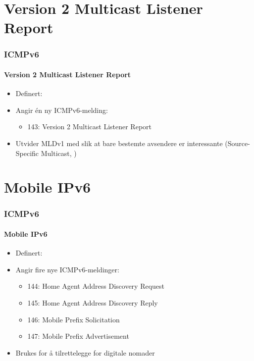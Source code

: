 \section{Version 2 Multicast Listener Report}
\begin{frame}%
  \frametitle{ICMPv6}
  \framesubtitle{Version 2 Multicast Listener Report}
  \begin{itemize}%
  \item Definert: 
  \item Angir én ny ICMPv6-melding:
    \begin{itemize}%
    \item 143: Version 2 Multicast Listener Report
    \end{itemize}
  \item Utvider MLDv1  med slik at bare bestemte avsendere
    er interessante (Source-Specific Multicast, )
  \end{itemize}
\end{frame}

\section{Mobile IPv6}
\begin{frame}%
  \frametitle{ICMPv6}
  \framesubtitle{Mobile IPv6}
  \begin{itemize}%
  \item Definert: 
  \item Angir fire nye ICMPv6-meldinger:
    \begin{itemize}%
    \item 144: Home Agent Address Discovery Request
    \item 145: Home Agent Address Discovery Reply
    \item 146: Mobile Prefix Solicitation
    \item 147: Mobile Prefix Advertisement
    \end{itemize}
  \item Brukes for å tilrettelegge for digitale nomader
  \end{itemize}
\end{frame}

